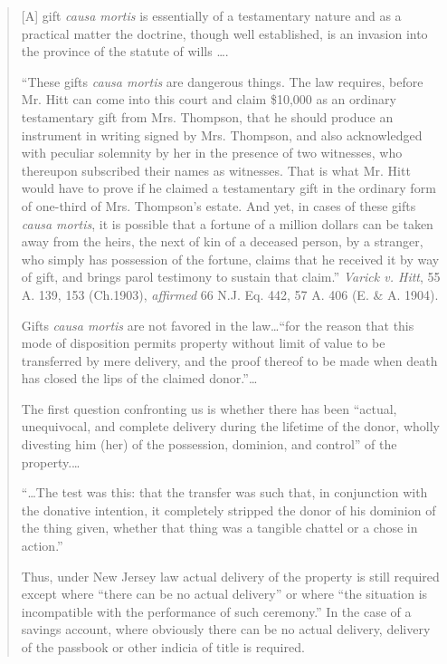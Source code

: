 \begin{quotation}
[A] gift \textit{causa mortis} is essentially of a testamentary nature and as a
practical matter the doctrine, though well established, is an invasion into the
province of the statute of wills \dots. 

``These gifts \textit{causa mortis} are dangerous things. The law requires,
before Mr. Hitt can come into this court and claim \$10,000 as an ordinary
testamentary gift from Mrs. Thompson, that he should produce an instrument in
writing signed by Mrs. Thompson, and also acknowledged with peculiar solemnity
by her in the presence of two witnesses, who thereupon subscribed their names
as witnesses. That is what Mr. Hitt would have to prove if he claimed a
testamentary gift in the ordinary form of one-third of Mrs. Thompson's estate.
And yet, in cases of these gifts \textit{causa mortis}, it is possible that a
fortune of a million dollars can be taken away from the heirs, the next of kin
of a deceased person, by a stranger, who simply has possession of the fortune,
claims that he received it by way of gift, and brings parol testimony to
sustain that claim.'' \emph{Varick v. Hitt}, 55 A. 139, 153 (Ch.1903),
\emph{affirmed} 66
N.J. Eq. 442, 57 A. 406 (E. \& A. 1904).

Gifts \textit{causa mortis} are not favored in the law\dots ``for the reason
that this mode of disposition permits property without limit of value to be
transferred by mere delivery, and the proof thereof to be made when death has
closed the lips of the claimed donor.''\ldots

The first question confronting us is whether there has been ``actual,
unequivocal, and complete delivery during the lifetime of the donor, wholly
divesting him (her) of the possession, dominion, and control'' of the
property.\ldots

``\ldots The test was this: that the transfer was such that, in conjunction with
the donative intention, it completely stripped the donor of his dominion of the
thing given, whether that thing was a tangible chattel or a chose in action.''

Thus, under New Jersey law actual delivery of the property is still required
except where ``there can be no actual delivery'' or where ``the situation is
incompatible with the performance of such ceremony.'' In the case of a savings
account, where obviously there can be no actual delivery, delivery of the
passbook or other indicia of title is required. 
\end{quotation}
